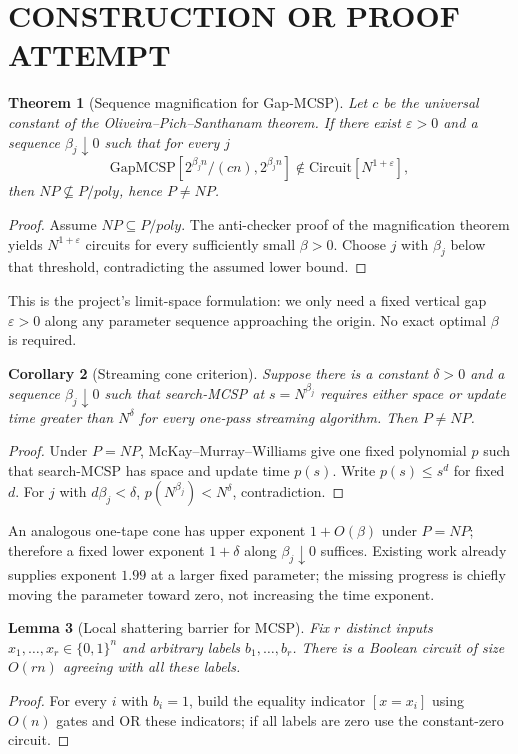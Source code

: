 \documentclass[11pt]{article}
\newtheorem{theorem}{Theorem}
\newtheorem{lemma}[theorem]{Lemma}
\newtheorem{corollary}[theorem]{Corollary}
\begin{document}
\section{CONSTRUCTION OR PROOF ATTEMPT}
\begin{theorem}[Sequence magnification for Gap-MCSP]
Let $c$ be the universal constant of the Oliveira--Pich--Santhanam theorem. If there exist $\varepsilon>0$ and a sequence $\beta_j\downarrow0$ such that for every $j$
\[\mathrm{GapMCSP}[2^{\beta_j n}/(cn),2^{\beta_j n}]\notin\mathrm{Circuit}[N^{1+\varepsilon}],\]
then $NP\not\subseteq P/poly$, hence $P\ne NP$.
\end{theorem}
\begin{proof}
Assume $NP\subseteq P/poly$. The anti-checker proof of the magnification theorem yields $N^{1+\varepsilon}$ circuits for every sufficiently small $\beta>0$. Choose $j$ with $\beta_j$ below that threshold, contradicting the assumed lower bound.
\end{proof}

This is the project's limit-space formulation: we only need a fixed vertical gap $\varepsilon>0$ along any parameter sequence approaching the origin. No exact optimal $\beta$ is required.

\begin{corollary}[Streaming cone criterion]
Suppose there is a constant $\delta>0$ and a sequence $\beta_j\downarrow0$ such that search-MCSP at $s=N^{\beta_j}$ requires either space or update time greater than $N^\delta$ for every one-pass streaming algorithm. Then $P\ne NP$.
\end{corollary}
\begin{proof}
Under $P=NP$, McKay--Murray--Williams give one fixed polynomial $p$ such that search-MCSP has space and update time $p(s)$. Write $p(s)\le s^d$ for fixed $d$. For $j$ with $d\beta_j<\delta$, $p(N^{\beta_j})<N^\delta$, contradiction.
\end{proof}

An analogous one-tape cone has upper exponent $1+O(\beta)$ under $P=NP$; therefore a fixed lower exponent $1+\delta$ along $\beta_j\downarrow0$ suffices. Existing work already supplies exponent $1.99$ at a larger fixed parameter; the missing progress is chiefly moving the parameter toward zero, not increasing the time exponent.

\begin{lemma}[Local shattering barrier for MCSP]
Fix $r$ distinct inputs $x_1,\ldots,x_r\in\{0,1\}^n$ and arbitrary labels $b_1,\ldots,b_r$. There is a Boolean circuit of size $O(rn)$ agreeing with all these labels.
\end{lemma}
\begin{proof}
For every $i$ with $b_i=1$, build the equality indicator $[x=x_i]$ using $O(n)$ gates and OR these indicators; if all labels are zero use the constant-zero circuit.
\end{proof}
\end{document}

